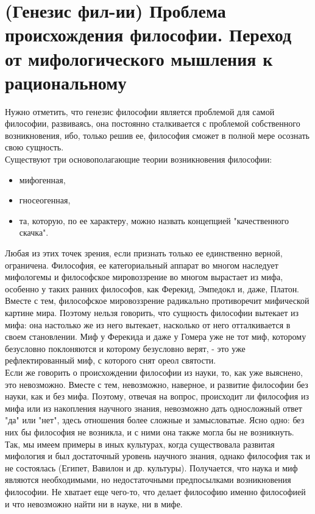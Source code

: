 \documentclass[12pt]{article}
\begin{document}
\section{(Генезис фил-ии) Проблема происхождения философии. Переход от мифологического мышления к рациональному}
Нужно отметить, что генезис философии является проблемой для самой философии, развиваясь, она постоянно
сталкивается с проблемой собственного возникновения, ибо, только решив ее, философия сможет в полной мере
осознать свою сущность.\\
Существуют три основополагающие теории возникновения философии:
\begin{itemize}
\item мифогенная,
\item гносеогенная,
\item та, которую, по ее характеру, можно назвать концепцией "качественного скачка".
\end{itemize}
Любая из этих точек зрения, если
признать только ее единственно верной, ограничена. Философия, ее категориальный аппарат во многом
наследует мифологемы и философское мировоззрение во многом вырастает из мифа, особенно у таких ранних
философов, как Ферекид, Эмпедокл и, даже, Платон. Вместе с тем, философское мировоззрение радикально
противоречит мифической картине мира. Поэтому нельзя говорить, что сущность философии вытекает из мифа:
она настолько же из него вытекает, насколько от него отталкивается в своем становлении. Миф у Ферекида и
даже у Гомера уже не тот миф, которому безусловно поклоняются и которому безусловно верят, - это уже
рефлектированный миф, с которого снят ореол святости.\\
Если же говорить о происхождении философии из науки, то, как уже выяснено, это невозможно. Вместе с тем,
невозможно, наверное, и развитие философии без науки, как и без мифа. Поэтому, отвечая на вопрос,
происходит ли философия из мифа или из накопления научного знания, невозможно дать односложный ответ
"да" или "нет", здесь отношения более сложные и замысловатые. Ясно одно: без них бы философия не возникла,
и с ними она также могла бы не возникнуть. Так, мы имеем примеры в иных культурах, когда существовала
развитая мифология и был достаточный уровень научного знания, однако философия так и не состоялась
(Египет, Вавилон и др. культуры). Получается, что наука и миф являются необходимыми, но недостаточными
предпосылками возникновения философии. Не хватает еще чего-то, что делает философию именно философией
и что невозможно найти ни в науке, ни в мифе.\\
\end{document}
